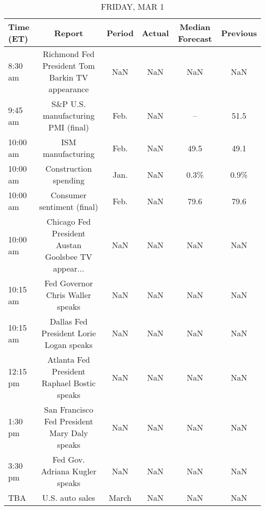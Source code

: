\documentclass{article}%
\begin{document}
%


\begin{table}[htbp]%
\caption{FRIDAY, MAR 1}%
\centering%
\begin{adjustbox}{width=1\textwidth}%
\begin{tabular}{lccccc}
\toprule
Time (ET) &                                             Report & Period & Actual & Median Forecast & Previous \\
\midrule
  8:30 am &    Richmond Fed President Tom Barkin TV appearance &    NaN &    NaN &             NaN &      NaN \\
  9:45 am &                 S\&P U.S. manufacturing PMI (final) &   Feb. &    NaN &              -- &     51.5 \\
 10:00 am &                                  ISM manufacturing &   Feb. &    NaN &            49.5 &     49.1 \\
 10:00 am &                              Construction spending &   Jan. &    NaN &            0.3\% &     0.9\% \\
 10:00 am &                         Consumer sentiment (final) &   Feb. &    NaN &            79.6 &     79.6 \\
 10:00 am & Chicago Fed President Austan Goolsbee TV appear... &    NaN &    NaN &             NaN &      NaN \\
 10:15 am &                   Fed Governor Chris Waller speaks &    NaN &    NaN &             NaN &      NaN \\
 10:15 am &            Dallas Fed President Lorie Logan speaks &    NaN &    NaN &             NaN &      NaN \\
 12:15 pm &        Atlanta Fed President Raphael Bostic speaks &    NaN &    NaN &             NaN &      NaN \\
  1:30 pm &       San Francisco Fed President Mary Daly speaks &    NaN &    NaN &             NaN &      NaN \\
  3:30 pm &                     Fed Gov. Adriana Kugler speaks &    NaN &    NaN &             NaN &      NaN \\
      TBA &                                    U.S. auto sales &  March &    NaN &             NaN &      NaN \\
\bottomrule
\end{tabular}
%
\end{adjustbox}%
\end{table}
\end{document}
